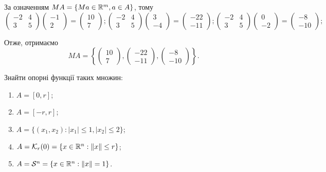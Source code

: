 \begin{solution}
	За означенням $MA = \{Ma\in \mathbb{R}^m, a\in A\}$, тому
	\newline
   \[ \begin{pmatrix}
   -2 & 4 \\
   3 & 5
  \end{pmatrix}
  \begin{pmatrix}
    -1 \\
    2 
  \end{pmatrix}=
  \begin{pmatrix}
    10 \\
    7 
  \end{pmatrix};
   \begin{pmatrix}
   -2 & 4 \\
   3 & 5
  \end{pmatrix}
  \begin{pmatrix}
    3 \\
    -4 
  \end{pmatrix}=
  \begin{pmatrix}
    -22 \\
    -11 
  \end{pmatrix};
   \begin{pmatrix}
   -2 & 4 \\
   3 & 5
  \end{pmatrix}
  \begin{pmatrix}
    0 \\
    -2 
  \end{pmatrix}=
  \begin{pmatrix}
    -8 \\
    -10 
  \end{pmatrix};
  \]
  
  Отже, отримаємо \[MA = 
  \left\{
  \begin{pmatrix}
    10 \\
    7 
  \end{pmatrix},
  \begin{pmatrix}
    -22 \\
    -11 
  \end{pmatrix},
  \begin{pmatrix}
    -8 \\
    -10 
  \end{pmatrix}
  \right\}.\]
\end{solution}

\begin{problem}
	Знайти опорні функції таких множин:

	\begin{enumerate}
		\item $A = [0, r]$;

		\item $A = [-r, r]$;

		\item $A = \{ (x_1, x_2): |x_1| \le 1, |x_2| \le 2 \}$;

		\item $A = \mathcal{K}_r (0) = \{ x \in \mathbb{R}^n: \|x\| \le r \}$;

		\item $A = \mathcal{S}^n = \{ x \in \mathbb{R}^n: \|x\| = 1 \}$.
	\end{enumerate}
\end{problem}

